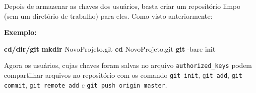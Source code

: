 \documentclass[
  a5paper,
  pagesize,
  9pt,
  pointlessnumbers,
  normalheadings,
  twoside=false
]{book}
\newenvironment{Shaded}{\begin{snugshade}}{\end{snugshade}}
\newcommand{\KeywordTok}[1]{\textcolor[rgb]{0.13,0.29,0.53}{\textbf{{#1}}}}
\newcommand{\NormalTok}[1]{{#1}}
\begin{document}
Depois de armazenar as chaves dos usuários, basta criar um repositório
limpo (sem um diretório de trabalho) para eles. Como visto
anteriormente:

\textbf{Exemplo:}

\begin{Shaded}
\begin{Highlighting}[]
\KeywordTok{cd/dir/git}
\KeywordTok{mkdir} \NormalTok{NovoProjeto.git}
\KeywordTok{cd} \NormalTok{NovoProjeto.git}
\KeywordTok{git} \NormalTok{-bare init}
\end{Highlighting}
\end{Shaded}

Agora os usuários, cujas chaves foram salvas no arquivo
\texttt{authorized\_keys} podem compartilhar arquivos no repositório com
os comando \texttt{git init}, \texttt{git add}, \texttt{git commit},
\texttt{git remote add} e \texttt{git push origin master}. %
\end{document}
